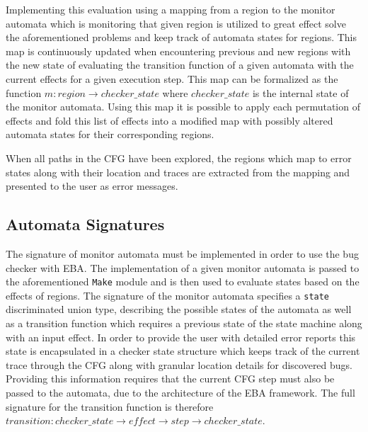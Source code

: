 \newpar Implementing this evaluation using a mapping from a region to the monitor automata which is monitoring that given region is utilized to great effect solve the aforementioned problems and keep track of automata states for regions. This map is continuously updated when encountering previous and new regions with the new state of evaluating the transition function of a given automata with the current effects for a given execution step. This map can be formalized as the function $m: region \rightarrow { checker\_state }$ where $ checker\_state $ is the internal state of the monitor automata. Using this map it is possible to apply each permutation of effects and fold this list of effects into a modified map with possibly altered automata states for their corresponding regions. 

\newpar When all paths  in the CFG have been explored, the regions which map to error states along with their location and traces are extracted from the mapping and presented to the user as error messages. 

\subsection{Automata Signatures}

The signature of monitor automata must be implemented in order to use the bug checker with EBA. The implementation of a given monitor automata is passed to the aforementioned \texttt{Make} module and is then used to evaluate states based on the effects of regions. The signature of the monitor automata specifies a \texttt{state} discriminated union type, describing the possible states of the automata as well as a transition function which requires a previous state of the state machine along with an input effect. In order to provide the user with detailed error reports this state is encapsulated in a checker state structure which keeps track of the current trace through the CFG along with granular location details for discovered bugs. Providing this information requires that the current CFG step must also be passed to the automata, due to the architecture of the EBA framework. The full signature for the transition function is therefore $transition: checker\_state \rightarrow effect \rightarrow step \rightarrow checker\_state$. 